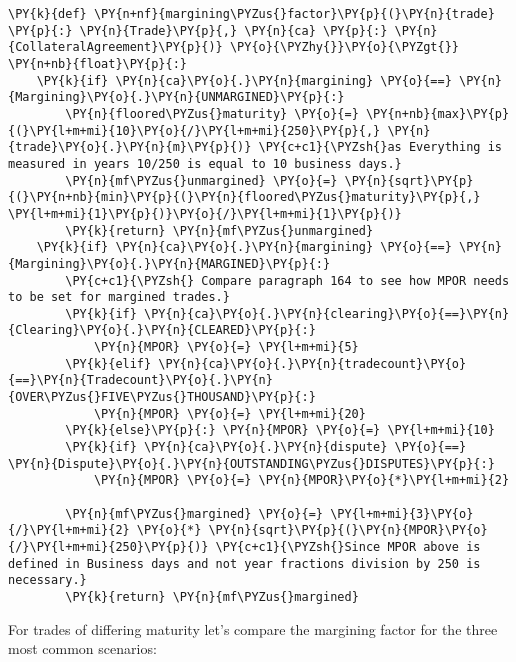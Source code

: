     \begin{tcolorbox}[breakable, size=fbox, boxrule=1pt, pad at break*=1mm,colback=cellbackground, colframe=cellborder]
\begin{Verbatim}[commandchars=\\\{\}]
\PY{k}{def} \PY{n+nf}{margining\PYZus{}factor}\PY{p}{(}\PY{n}{trade} \PY{p}{:} \PY{n}{Trade}\PY{p}{,} \PY{n}{ca} \PY{p}{:} \PY{n}{CollateralAgreement}\PY{p}{)} \PY{o}{\PYZhy{}}\PY{o}{\PYZgt{}} \PY{n+nb}{float}\PY{p}{:}
    \PY{k}{if} \PY{n}{ca}\PY{o}{.}\PY{n}{margining} \PY{o}{==} \PY{n}{Margining}\PY{o}{.}\PY{n}{UNMARGINED}\PY{p}{:}
        \PY{n}{floored\PYZus{}maturity} \PY{o}{=} \PY{n+nb}{max}\PY{p}{(}\PY{l+m+mi}{10}\PY{o}{/}\PY{l+m+mi}{250}\PY{p}{,} \PY{n}{trade}\PY{o}{.}\PY{n}{m}\PY{p}{)} \PY{c+c1}{\PYZsh{}as Everything is measured in years 10/250 is equal to 10 business days.}
        \PY{n}{mf\PYZus{}unmargined} \PY{o}{=} \PY{n}{sqrt}\PY{p}{(}\PY{n+nb}{min}\PY{p}{(}\PY{n}{floored\PYZus{}maturity}\PY{p}{,} \PY{l+m+mi}{1}\PY{p}{)}\PY{o}{/}\PY{l+m+mi}{1}\PY{p}{)}
        \PY{k}{return} \PY{n}{mf\PYZus{}unmargined}
    \PY{k}{if} \PY{n}{ca}\PY{o}{.}\PY{n}{margining} \PY{o}{==} \PY{n}{Margining}\PY{o}{.}\PY{n}{MARGINED}\PY{p}{:}
        \PY{c+c1}{\PYZsh{} Compare paragraph 164 to see how MPOR needs to be set for margined trades.}
        \PY{k}{if} \PY{n}{ca}\PY{o}{.}\PY{n}{clearing}\PY{o}{==}\PY{n}{Clearing}\PY{o}{.}\PY{n}{CLEARED}\PY{p}{:}
            \PY{n}{MPOR} \PY{o}{=} \PY{l+m+mi}{5}
        \PY{k}{elif} \PY{n}{ca}\PY{o}{.}\PY{n}{tradecount}\PY{o}{==}\PY{n}{Tradecount}\PY{o}{.}\PY{n}{OVER\PYZus{}FIVE\PYZus{}THOUSAND}\PY{p}{:}
            \PY{n}{MPOR} \PY{o}{=} \PY{l+m+mi}{20}
        \PY{k}{else}\PY{p}{:} \PY{n}{MPOR} \PY{o}{=} \PY{l+m+mi}{10}
        \PY{k}{if} \PY{n}{ca}\PY{o}{.}\PY{n}{dispute} \PY{o}{==} \PY{n}{Dispute}\PY{o}{.}\PY{n}{OUTSTANDING\PYZus{}DISPUTES}\PY{p}{:}
            \PY{n}{MPOR} \PY{o}{=} \PY{n}{MPOR}\PY{o}{*}\PY{l+m+mi}{2}
        
        \PY{n}{mf\PYZus{}margined} \PY{o}{=} \PY{l+m+mi}{3}\PY{o}{/}\PY{l+m+mi}{2} \PY{o}{*} \PY{n}{sqrt}\PY{p}{(}\PY{n}{MPOR}\PY{o}{/}\PY{l+m+mi}{250}\PY{p}{)} \PY{c+c1}{\PYZsh{}Since MPOR above is defined in Business days and not year fractions division by 250 is necessary.}
        \PY{k}{return} \PY{n}{mf\PYZus{}margined}
\end{Verbatim}
\end{tcolorbox}

    For trades of differing maturity let's compare the margining factor for
the three most common scenarios:

